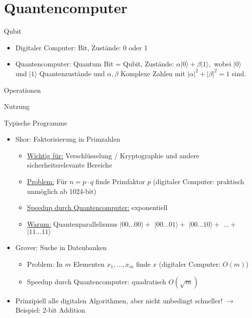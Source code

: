\section{Quantencomputer}

\begin{defi}[Quantencomputer]{Qubit}
    \begin{itemize}
        \item Digitaler Computer: Bit, Zustände: 0 oder 1
        \item Quantencomputer: Quantum Bit = Qubit,
              $\text{Zustände: } \alpha|0\rangle + \beta|1\rangle,$
              wobei $|0\rangle$ und $|1\rangle$ Quantenzustände und
              $\alpha, \beta$ Komplexe Zahlen mit $|\alpha|^2 + |\beta|^2 = 1$ sind.
    \end{itemize}
\end{defi}

\begin{defi}[Quantencomputer]{Operationen}

\end{defi}

\begin{defi}[Quantencomputer]{Nutzung}

\end{defi}

\begin{defi}[Quantencomputer]{Typische Programme}
    \begin{itemize}
        \item Shor: Faktorisierung in Primzahlen
              \begin{itemize}
                  \item \underline{Wichtig für:} Verschlüsselung / Kryptographie und andere sicherheitsrelevante Bereiche
                  \item \underline{Problem:} Für $n=p\cdot q$ finde Primfaktor $p$
                        (digitaler Computer: praktisch unmöglich ab 1024-bit)
                  \item \underline{Speedup durch Quantencomputer:} exponentiell
                  \item \underline{Warum:} Quantenparallelismus $|00\ldots00\rangle+$ $|00\ldots01\rangle+$ $|00\ldots10\rangle+$ $\ldots+$ $|11\ldots11\rangle$
              \end{itemize}
        \item Grover: Suche in Datenbanken
              \begin{itemize}
                  \item Problem: In $m$ Elementen $x_1, \ldots, x_m$ finde $x$ (digitaler Computer: $O(m)$)
                  \item Speedup durch Quantencomputer: quadratisch $O(\sqrt{m})$
              \end{itemize}
        \item Prinzipiell alle digitalen Algorithmen, aber nicht unbedingt schneller! $\to$ Beispiel: 2-bit Addition
    \end{itemize}
\end{defi}

